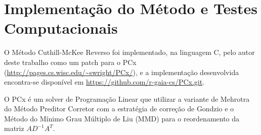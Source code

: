 \section{Implementação do Método e Testes Computacionais}
O Método Cuthill-McKee Reverso foi implementado, na linguagem C, pelo autor
deste trabalho como um patch para o PCx
(\url{http://pages.cs.wisc.edu/~swright/PCx/}), e a implementação desenvolvida
encontra-se disponível em \url{https://github.com/r-gaia-cs/PCx.git}.

O PCx é um solver de Programação Linear que utilizar a variante de Mehrotra do
Método Preditor Corretor com a estratégia de correção de Gondzio e o Método do
Mínimo Grau Múltiplo de Liu\cite{George:1981:ComputerSolutionPD} (MMD) para o
reordenamento da matriz $A D^{-1} A^T$.
